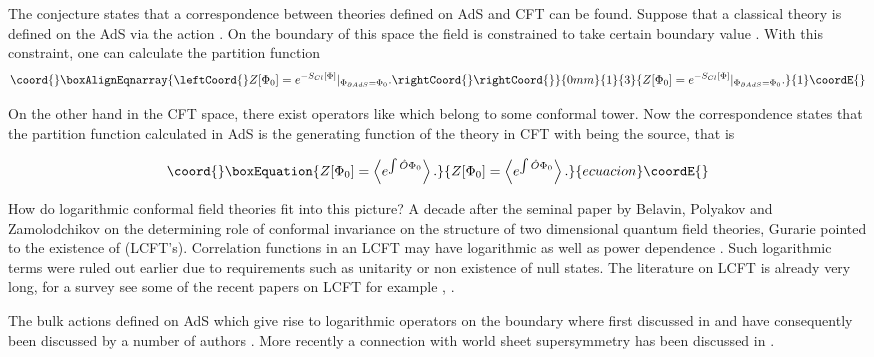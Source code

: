 \documentclass[a4paper,11pt]{article}
\begin{document}
The conjecture states that a correspondence between theories
defined on AdS\coordHE{} and CFT\coordHE{} can be found. Suppose that a
classical theory is defined on the AdS\coordHE{} via the action
\coordHE{}. On the boundary of this space the field is constrained
to take certain boundary value \coordHE{}.
With this constraint, one can calculate the partition function
\begin{eqnarray}\coord{}\boxAlignEqnarray{\leftCoord{}
Z[\Phi_0]={e^{-S_{Cl}[\Phi]}}|_{\Phi_{\partial AdS}=\Phi_0}.\rightCoord{}
\rightCoord{}}{0mm}{1}{3}{
Z[\Phi_0]={e^{-S_{Cl}[\Phi]}}|_{\Phi_{\partial AdS}=\Phi_0}.
}{1}\coordE{}\end{eqnarray}

On the other hand in the CFT\coordHE{} space, there exist operators
like \coordHE{} which belong to some conformal tower. Now the
correspondence states that the partition function calculated in
AdS is the generating function of the theory in CFT with \coordHE{}
being the source, that is

\begin{equation}\coord{}\boxEquation{\label{AdS/CFT}
Z[\Phi_0]=\left\langle e^{\int\hat{O}\Phi_0} \right\rangle.
}{Z[\Phi_0]=\left\langle e^{\int\hat{O}\Phi_0} \right\rangle.
}{ecuacion}\coordE{}\end{equation}

How do logarithmic conformal field theories fit into this
picture? A decade after the seminal paper by Belavin, Polyakov and
Zamolodchikov \cite {BPZ} on the determining role of conformal
invariance on the structure of two dimensional quantum field
theories, Gurarie \cite{Gur} pointed to the existence of
(LCFT's). Correlation functions in an LCFT may have logarithmic
as well as power dependence \cite{Kogan}. Such logarithmic terms
were ruled out earlier due to requirements such as unitarity or
non existence of null states. The literature on LCFT is already
very long, for a survey see some of the recent papers on LCFT for
example \cite{FlohrNew}, \cite{Lewis}.

The bulk actions defined on AdS\coordHE{} which give rise to
logarithmic operators on the boundary where first discussed in
\cite{Khorrami,KoganAds} and have consequently been discussed by
a number of authors \cite{Lewis,many}. More recently a connection with
world sheet supersymmetry has been discussed in
\cite{KoganPolyakov}.
\end{document}
